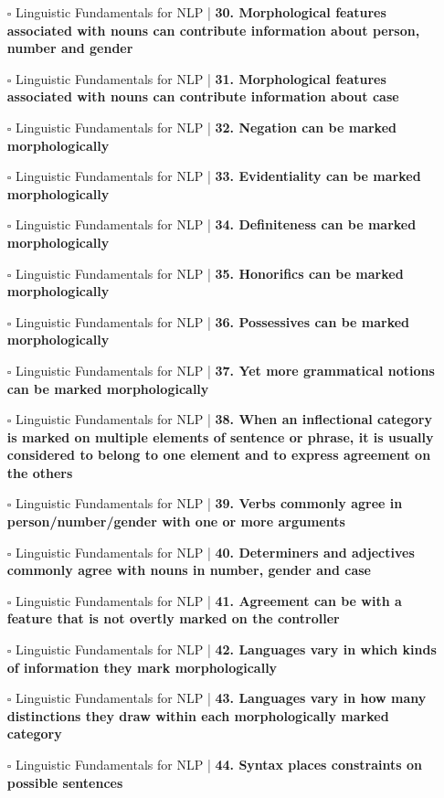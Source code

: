 \documentclass[a4, landscape, 12pt]{article}
\newcommand{\checkbox}{$\square$}%
\begin{document}
\begin{itemize}
{}
\item [\checkbox]  Linguistic Fundamentals for NLP | \textbf{ 30. Morphological features associated with nouns can contribute information about person, number and gender
}
\item [\checkbox]  Linguistic Fundamentals for NLP | \textbf{ 31. Morphological features associated with nouns can contribute information about case
}
\item [\checkbox]  Linguistic Fundamentals for NLP | \textbf{ 32. Negation can be marked morphologically
}
\item [\checkbox]  Linguistic Fundamentals for NLP | \textbf{ 33. Evidentiality can be marked morphologically
}
\item [\checkbox]  Linguistic Fundamentals for NLP | \textbf{ 34. Definiteness can be marked morphologically
}
\item [\checkbox]  Linguistic Fundamentals for NLP | \textbf{ 35. Honorifics can be marked morphologically
}
\item [\checkbox]  Linguistic Fundamentals for NLP | \textbf{ 36. Possessives can be marked morphologically
}
\item [\checkbox]  Linguistic Fundamentals for NLP | \textbf{ 37. Yet more grammatical notions can be marked morphologically
}
\item [\checkbox]  Linguistic Fundamentals for NLP | \textbf{ 38. When an inflectional category is marked on multiple elements of sentence or phrase, it is usually considered to belong to one element and to express agreement on the others
}
\item [\checkbox]  Linguistic Fundamentals for NLP | \textbf{ 39. Verbs commonly agree in person/number/gender with one or more arguments
}
\item [\checkbox]  Linguistic Fundamentals for NLP | \textbf{ 40. Determiners and adjectives commonly agree with nouns in number, gender and case
}
\item [\checkbox]  Linguistic Fundamentals for NLP | \textbf{ 41. Agreement can be with a feature that is not overtly marked on the controller
}
\item [\checkbox]  Linguistic Fundamentals for NLP | \textbf{ 42. Languages vary in which kinds of information they mark morphologically
}
\item [\checkbox]  Linguistic Fundamentals for NLP | \textbf{ 43. Languages vary in how many distinctions they draw within each morphologically marked category
}
\item [\checkbox]  Linguistic Fundamentals for NLP | \textbf{ 44. Syntax places constraints on possible sentences
}
\end{itemize}
\end{document}
